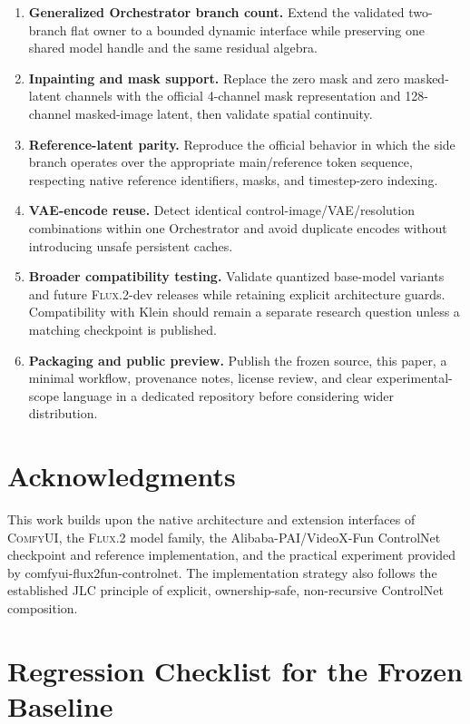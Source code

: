 \documentclass[11pt]{article}
\newcommand{\FluxTwo}{\textsc{Flux.2}}
\newcommand{\ComfyUI}{\textsc{ComfyUI}}
\newcommand{\JLC}{\textsc{JLC}}
\begin{document}
\begin{enumerate}
  \item \textbf{Generalized Orchestrator branch count.} Extend the validated two-branch flat owner to a bounded dynamic interface while preserving one shared model handle and the same residual algebra.
  \item \textbf{Inpainting and mask support.} Replace the zero mask and zero masked-latent channels with the official 4-channel mask representation and 128-channel masked-image latent, then validate spatial continuity.
  \item \textbf{Reference-latent parity.} Reproduce the official behavior in which the side branch operates over the appropriate main/reference token sequence, respecting native reference identifiers, masks, and timestep-zero indexing.
  \item \textbf{VAE-encode reuse.} Detect identical control-image/VAE/resolution combinations within one Orchestrator and avoid duplicate encodes without introducing unsafe persistent caches.
  \item \textbf{Broader compatibility testing.} Validate quantized base-model variants and future \FluxTwo{}-dev releases while retaining explicit architecture guards. Compatibility with Klein should remain a separate research question unless a matching checkpoint is published.
  \item \textbf{Packaging and public preview.} Publish the frozen source, this paper, a minimal workflow, provenance notes, license review, and clear experimental-scope language in a dedicated repository before considering wider distribution.
\end{enumerate}

\section*{Acknowledgments}

This work builds upon the native architecture and extension interfaces of \ComfyUI{}, the \FluxTwo{} model family, the Alibaba-PAI/VideoX-Fun ControlNet checkpoint and reference implementation, and the practical experiment provided by comfyui-flux2fun-controlnet. The implementation strategy also follows the established \JLC{} principle of explicit, ownership-safe, non-recursive ControlNet composition.

\appendix

\section{Regression Checklist for the Frozen Baseline}
\end{document}

